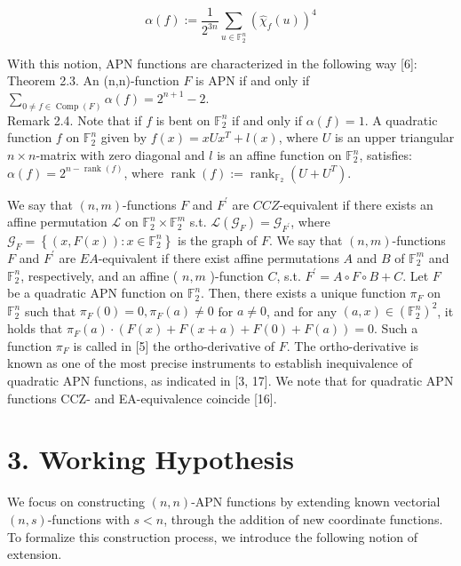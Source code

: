 \documentclass[10pt]{article}
\begin{document}
\begin{equation*}
\alpha(f):=\frac{1}{2^{3 n}} \sum_{u \in \mathbb{F}_{2}^{n}}\left(\hat{\chi}_{f}(u)\right)^{4} \tag{2.1}
\end{equation*}


With this notion, APN functions are characterized in the following way [6]:\\
Theorem 2.3. An (n,n)-function $F$ is APN if and only if $\sum_{0 \neq f \in \operatorname{Comp}(F)} \alpha(f)=2^{n+1}-2$.\\
Remark 2.4. Note that if $f$ is bent on $\mathbb{F}_{2}^{n}$ if and only if $\alpha(f)=1$. A quadratic function $f$ on $\mathbb{F}_{2}^{n}$ given by $f(x)=x U x^{T}+l(x)$, where $U$ is an upper triangular $n \times n$-matrix with zero diagonal and $l$ is an affine function on $\mathbb{F}_{2}^{n}$, satisfies: $\alpha(f)=2^{n-\operatorname{rank}(f)}$, where $\operatorname{rank}(f):=\operatorname{rank}_{\mathbb{F}_{2}}\left(U+U^{T}\right)$.

We say that $(n, m)$-functions $F$ and $F^{\prime}$ are $C C Z$-equivalent if there exists an affine permutation $\mathcal{L}$ on $\mathbb{F}_{2}^{n} \times \mathbb{F}_{2}^{m}$ s.t. $\mathcal{L}\left(\mathcal{G}_{F}\right)=\mathcal{G}_{F^{\prime}}$, where $\mathcal{G}_{F}=\left\{(x, F(x)): x \in \mathbb{F}_{2}^{n}\right\}$ is the graph of $F$. We say that $(n, m)$-functions $F$ and $F^{\prime}$ are $E A$-equivalent if there exist affine permutations $A$ and $B$ of $\mathbb{F}_{2}^{m}$ and $\mathbb{F}_{2}^{n}$, respectively, and an affine ( $n, m$ )-function $C$, s.t. $F^{\prime}=A \circ F \circ B+C$. Let $F$ be a quadratic APN function on $\mathbb{F}_{2}^{n}$. Then, there exists a unique function $\pi_{F}$ on $\mathbb{F}_{2}^{n}$ such that $\pi_{F}(0)=0, \pi_{F}(a) \neq 0$ for $a \neq 0$, and for any $(a, x) \in\left(\mathbb{F}_{2}^{n}\right)^{2}$, it holds that $\pi_{F}(a) \cdot(F(x)+F(x+a)+F(0)+F(a))=0$. Such a function $\pi_{F}$ is called in [5] the ortho-derivative of $F$. The ortho-derivative is known as one of the most precise instruments to establish inequivalence of quadratic APN functions, as indicated in [3, 17]. We note that for quadratic APN functions CCZ- and EA-equivalence coincide [16].

\section*{3. Working Hypothesis}
We focus on constructing $(n, n)$-APN functions by extending known vectorial $(n, s)$-functions with $s<n$, through the addition of new coordinate functions. To formalize this construction process, we introduce the following notion of extension.
\end{document}
